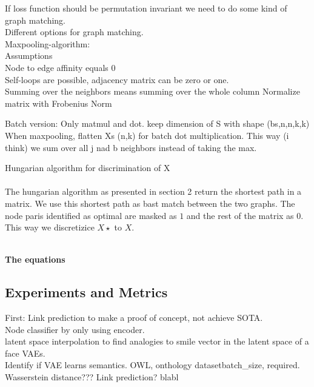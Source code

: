 If loss function should be permutation invariant we need to do some kind of graph matching.\\
Different options for graph matching.\\
Maxpooling-algorithm:\\
Assumptions\\
Node to edge affinity equals 0\\

Self-loops are possible, adjacency matrix can be zero or one.\\

Summing over the neighbors means summing over the whole column
Normalize matrix with Frobenius Norm

Batch version:
Only matmul and dot. keep dimension of S with shape (bs,n,n,k,k)
When maxpooling, flatten Xs (n,k) for batch dot multiplication. This way (i think) we sum over all j nad b neighbors instead of taking the max.  


Hungarian algorithm for discrimination of X \\
\\
The hungarian algorithm as presented in section 2 return the shortest path in a matrix. We use this shortest path as bast match between the two graphs. The node paris identified as optimal are masked as $1$ and the rest of the matrix as $0$. This way we discretizice $X\star$ to $X$. 

\\
\textbf{The equations}

\subsection{Experiments and Metrics}

First:
Link prediction to make a proof of concept, not achieve SOTA.\\
Node classifier by only using encoder.\\
latent space interpolation to find analogies to smile vector in the latent space of a face VAEs.\\
Identify if VAE learns semantics. OWL, onthology datasetbatch_size,  required.\\

Wasserstein distance???
Link prediction?
blabl
